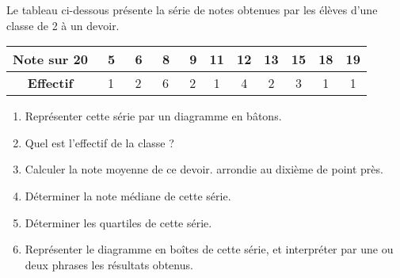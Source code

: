 
\begin{exercice}\label{exosmath-0147}

    Le tableau ci-dessous présente la série de notes obtenues par les
élèves d'une classe de 2  à un devoir.

\begin{center}
  \begin{tabular}{|c|*{10}{c|}}
    \hline
    \textbf{Note sur 20} & \ 5&\ 6&\ 8&\ 9&11&12&13&15&18&19 \\
    \hline
    \textbf{Effectif} & \ 1&\ 2&\ 6&\ 2&1&4&2&3&1&1 \\
    \hline
  \end{tabular}
\end{center}
\medskip

\begin{enumerate}
\item Représenter cette série par un diagramme en bâtons.
\item Quel est l'effectif de la classe ?
\item Calculer la note moyenne de ce devoir. 
  arrondie au dixième de point près.
\item Déterminer la note médiane de cette série.
\item Déterminer les quartiles de cette série.
\item Représenter le diagramme en boîtes de cette série, et
  interpréter par une ou deux phrases les résultats obtenus.
\end{enumerate}



\end{exercice}
